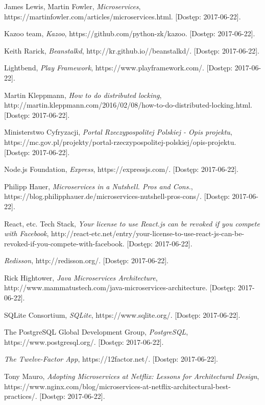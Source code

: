 \documentclass[licencjacka]{pracamgr}
\begin{document}
\begin{thebibliography}{99}
 James Lewis, Martin Fowler, \textit{Microservices},
https://martinfowler.com/articles/microservices.html. [Dostęp: 2017-06-22].

 Kazoo team, \textit{Kazoo},
https://github.com/python-zk/kazoo. [Dostęp: 2017-06-22].

 Keith Rarick, \textit{Beanstalkd},
http://kr.github.io//beanstalkd/. [Dostęp: 2017-06-22].

 Lightbend, \textit{Play Framework},
https://www.playframework.com/. [Dostęp: 2017-06-22].

 Martin Kleppmann, \textit{How to do distributed locking},
http://martin.kleppmann.com/2016/02/08/how-to-do-distributed-locking.html. [Dostęp: 2017-06-22].

 Ministerstwo Cyfryzacji, \textit{Portal Rzeczypospolitej Polskiej - Opis projektu},
https://mc.gov.pl/projekty/portal-rzeczypospolitej-polskiej/opis-projektu. [Dostęp: 2017-06-22].

 Node.js Foundation, \textit{Express},
https://expressjs.com/. [Dostęp: 2017-06-22].

 Philipp Hauer, \textit{Microservices in a Nutshell. Pros and Cons.},
https://blog.philipphauer.de/microservices-nutshell-pros-cons/. [Dostęp: 2017-06-22].

 React, etc. Tech Stack, \textit{Your license to use React.js can be revoked if you compete with Facebook},
http://react-etc.net/entry/your-license-to-use-react-js-can-be-revoked-if-you-compete-with-facebook. [Dostęp: 2017-06-22].

 \textit{Redisson},
http://redisson.org/. [Dostęp: 2017-06-22].

 Rick Hightower, \textit{Java Microservices Architecture},
http://www.mammatustech.com/java-microservices-architecture. [Dostęp: 2017-06-22].

 SQLite Consortium, \textit{SQLite},
https://www.sqlite.org/. [Dostęp: 2017-06-22].

 The PostgreSQL Global Development Group, \textit{PostgreSQL},
https://www.postgresql.org/. [Dostęp: 2017-06-22].

 \textit{The Twelve-Factor App}, https://12factor.net/. [Dostęp: 2017-06-22].

 Tony Mauro, \textit{Adopting Microservices at Netflix: Lessons for Architectural Design},
https://www.nginx.com/blog/microservices-at-netflix-architectural-best-practices/. [Dostęp: 2017-06-22].


\end{thebibliography}
\end{document}
